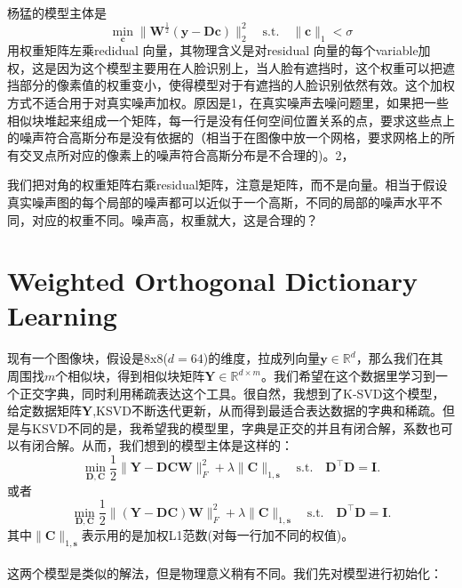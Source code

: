 \documentclass[10pt,twocolumn,letterpaper]{article}
\begin{document}
杨猛的模型主体是
\begin{equation}
\min_{\mathbf{c}}\|\mathbf{W}^{\frac{1}{2}}(\mathbf{y}-\mathbf{D}\mathbf{c})\|_{2}^{2}
\quad
\text{s.t.}
\quad
\|\mathbf{c}\|_{1}<\sigma
\end{equation}
用权重矩阵左乘redidual 向量，其物理含义是对residual 向量的每个variable加权，这是因为这个模型主要用在人脸识别上，当人脸有遮挡时，这个权重可以把遮挡部分的像素值的权重变小，使得模型对于有遮挡的人脸识别依然有效。这个加权方式不适合用于对真实噪声加权。原因是1，在真实噪声去噪问题里，如果把一些相似块堆起来组成一个矩阵，每一行是没有任何空间位置关系的点，要求这些点上的噪声符合高斯分布是没有依据的（相当于在图像中放一个网格，要求网格上的所有交叉点所对应的像素上的噪声符合高斯分布是不合理的)。2，

我们把对角的权重矩阵右乘residual矩阵，注意是矩阵，而不是向量。相当于假设真实噪声图的每个局部的噪声都可以近似于一个高斯，不同的局部的噪声水平不同，对应的权重不同。噪声高，权重就大，这是合理的？


\section{Weighted Orthogonal Dictionary Learning}
现有一个图像块，假设是8x8($d=64$)的维度，拉成列向量$\mathbf{y}\in\mathbb{R}^{d}$，那么我们在其周围找$m$个相似块，得到相似块矩阵$\mathbf{Y}\in\mathbb{R}^{d\times m}$。我们希望在这个数据里学习到一个正交字典，同时利用稀疏表达这个工具。很自然，我想到了K-SVD这个模型，给定数据矩阵$\mathbf{Y}$,KSVD不断迭代更新，从而得到最适合表达数据的字典和稀疏。但是与KSVD不同的是，我希望我的模型里，字典是正交的并且有闭合解，系数也可以有闭合解。从而，我们想到的模型主体是这样的：
\begin{equation}
\min_{\mathbf{D},\mathbf{C}}\frac{1}{2}\|\mathbf{Y}-\mathbf{D}\mathbf{C}\mathbf{W}\|_{F}^{2}
+
\lambda\|\mathbf{C}\|_{1,\mathbf{s}}
\quad
\text{s.t.}
\quad
\mathbf{D}^{\top}\mathbf{D} =\mathbf{I}. 
\end{equation}
或者
\begin{equation}
\min_{\mathbf{D},\mathbf{C}}\frac{1}{2}\|(\mathbf{Y}-\mathbf{D}\mathbf{C})\mathbf{W}\|_{F}^{2}
+
\lambda\|\mathbf{C}\|_{1,\mathbf{s}}
\quad
\text{s.t.}
\quad
\mathbf{D}^{\top}\mathbf{D} =\mathbf{I}. 
\end{equation}
其中$\|\mathbf{C}\|_{1,\mathbf{s}}$表示用的是加权L1范数(对每一行加不同的权值)。
\\
\\
这两个模型是类似的解法，但是物理意义稍有不同。我们先对模型进行初始化：
\end{document}
